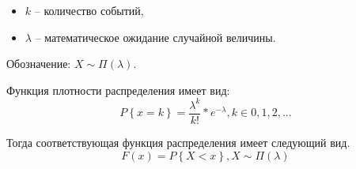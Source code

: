 \begin{itemize}
	\item $k$ -- количество событий,
	\item $\lambda$ -- математическое ожидание случайной величины.
\end{itemize}

Обозначение: $X \sim \Pi(\lambda)$.

Функция плотности распределения имеет вид:
\begin{equation}
	P\left\{x = k\right\} = \frac {{\lambda}^k}{k!} * {e}^{- \lambda}, k \in 0, 1, 2, ...
\end{equation}

Тогда соответствующая функция распределения имеет следующий вид.
\begin{equation}
	F(x) = P\left\{X < x\right\}, X \sim \Pi(\lambda)
\end{equation}

%
%
%
%

